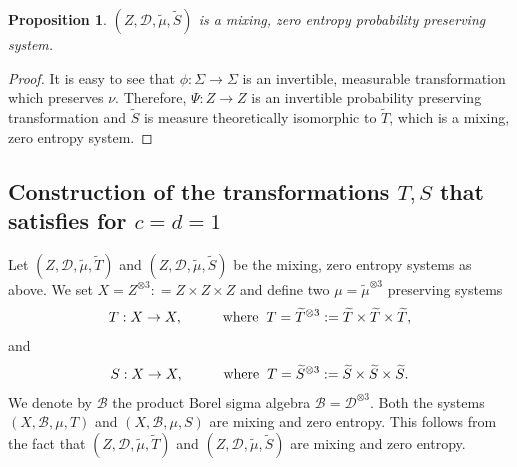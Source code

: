 \documentclass[12pt,reqno]{amsart}
\newcommand{\B}{\mathcal{B}}
\newcommand{\TT}{\widetilde{T}}
\newcommand{\TS}{\widetilde{S}}
\newcommand{\Tmu}{\widetilde{\mu}}
\newtheorem{prop}[thm]{Proposition}
\theoremstyle{definition}
\begin{document}
\begin{prop}\label{prop:TS_WM_0} $(Z,\mathcal{D},\Tmu,\TS)$ is a  mixing, zero entropy probability preserving system.
\end{prop}
\begin{proof} It is easy to see that $\phi:\Sigma\to\Sigma$ is an invertible, measurable transformation which preserves $\nu$. Therefore,  $\Psi : Z \rightarrow Z$ is an invertible probability preserving transformation and $\TS$ is measure theoretically isomorphic to $\TT$, which is a mixing, zero entropy system. 
\end{proof}

\subsection{Construction of the transformations $T,S$ that satisfies \label{sub: c=d=1} for $c=d=1$}\label{sec:construction_T_S} Let $(Z,\mathcal{D},\Tmu,\TT)$ and $(Z,\mathcal{D},\Tmu,\TS)$ be the  mixing, zero entropy systems as above. We set  $X = Z^{\otimes 3} : = Z \times Z \times Z $ and define two $\mu = \Tmu^{\otimes3}$ preserving systems
\[
T : X \rightarrow X, \hspace{10 mm} \mathrm{where} \hspace{2 mm} T = \TT^{\otimes3} : = \TT \times \TT \times \TT,
\]
and
\[
S : X \rightarrow X, \hspace{10 mm} \mathrm{where} \hspace{2 mm} T = \TS^{\otimes3} : = \TS \times \TS \times \TS. 
\]
We denote by $\B$ the product Borel sigma algebra $\B = \mathcal{D}^{\otimes3}$. Both the systems $(X,\B,\mu, T)$ and $(X,\B,\mu, S)$ are mixing and zero entropy. This follows from the fact that $(Z,\mathcal{D},\Tmu,\TT)$ and $(Z,\mathcal{D},\Tmu,\TS)$ are mixing and zero entropy. 
\end{document}
